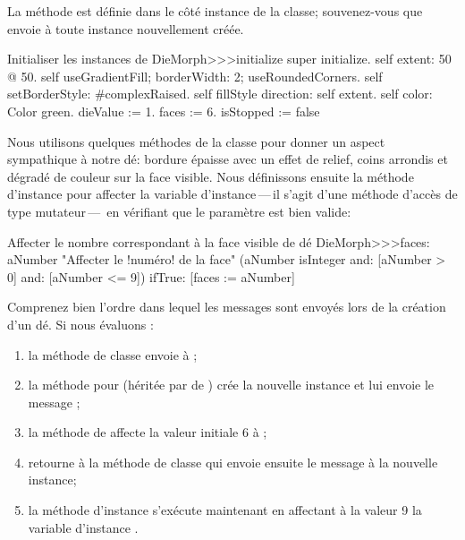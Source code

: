 \documentclass[a4paper,10pt,twoside]{book}
\begin{document}
La méthode  est définie dans le côté instance
de la classe; souvenez-vous que  envoie  à
toute instance nouvellement créée.

\begin{method}{Initialiser les instances de }
DieMorph>>>initialize
	super initialize.
	self extent: 50 @ 50.
	self useGradientFill; borderWidth: 2; useRoundedCorners.
	self setBorderStyle: #complexRaised.
	self fillStyle direction: self extent.
	self color: Color green.
	dieValue := 1.
	faces := 6.
	isStopped := false
\end{method}

Nous utilisons quelques méthodes de la classe 
pour donner un aspect sympathique à notre dé: bordure épaisse
avec un effet de relief, coins arrondis et dégradé de couleur sur
la face visible.
Nous définissons ensuite la méthode d'instance  pour
affecter la variable d'instance\,---\,il s'agit d'une méthode
d'accès de type mutateur\,---\, en vérifiant que le paramètre est
bien valide:
\begin{method}{Affecter le nombre correspondant à la face visible de dé}
DieMorph>>>faces: aNumber
	"Affecter le !numéro! de la face"
	(aNumber isInteger
			and: [aNumber > 0]
			and: [aNumber <= 9])
		ifTrue: [faces := aNumber]
\end{method}

Comprenez bien l'ordre dans lequel les messages sont envoyés lors de
la création d'un dé. Si nous évaluons :
\begin{enumerate}
	\item la méthode de classe  envoie
       à ;
	\item la méthode pour  (héritée par  de ) crée la nouvelle instance et lui envoie
       le message ;
	\item la méthode  de  affecte la
      valeur initiale 6 à ;
	\item {} retourne à la méthode de
      classe  qui envoie ensuite le
      message  à la nouvelle instance;
	\item la méthode d'instance  s'exécute
      maintenant en affectant à la valeur 9 la variable d'instance
      .
\end{enumerate}
\end{document}

